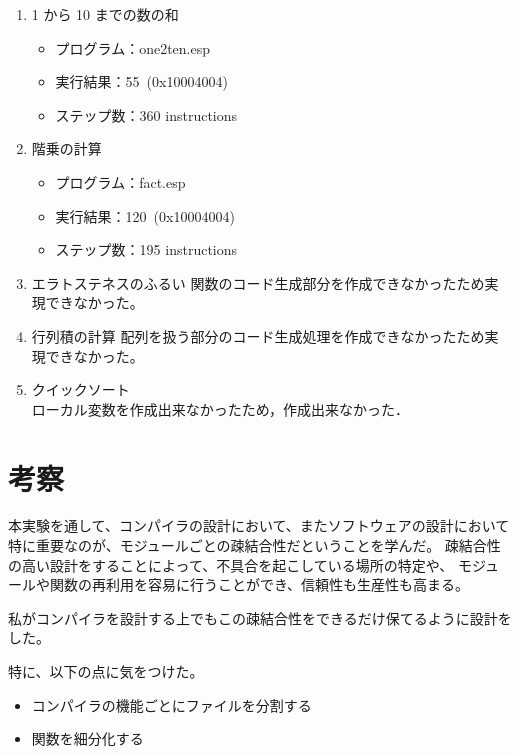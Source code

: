 \documentclass[11pt,a4j]{jarticle}
\begin{document}
\begin{enumerate}
\item {1 から 10 までの数の和 }
  \begin{itemize}
  \item
    プログラム：one2ten.esp
  \item
    実行結果：55~(0x10004004)
  \item
    ステップ数：360 instructions 
  \end{itemize}
\item {階乗の計算}
  \begin{itemize}
  \item
    プログラム：fact.esp
  \item
    実行結果：120~(0x10004004) %
  \item
    ステップ数：195 instructions %
  \end{itemize}
\item {エラトステネスのふるい}
  関数のコード生成部分を作成できなかったため実現できなかった。
\item {行列積の計算}
  配列を扱う部分のコード生成処理を作成できなかったため実現できなかった。
\item {クイックソート}\\
  ローカル変数を作成出来なかったため，作成出来なかった．
\end{enumerate}



\section{考察}

本実験を通して、コンパイラの設計において、またソフトウェアの設計において
特に重要なのが、モジュールごとの疎結合性だということを学んだ。
疎結合性の高い設計をすることによって、不具合を起こしている場所の特定や、
モジュールや関数の再利用を容易に行うことができ、信頼性も生産性も高まる。

私がコンパイラを設計する上でもこの疎結合性をできるだけ保てるように設計をした。

特に、以下の点に気をつけた。

\begin{itemize}
    \item コンパイラの機能ごとにファイルを分割する
    \item 関数を細分化する
\end{itemize}
\end{document}
